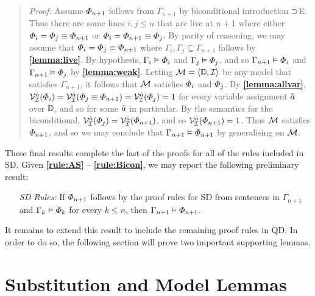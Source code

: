 
\begin{quote} 
  \textit{Proof:} Assume $\varPhi_{n+1}$ follows from $\Gamma_{n+1}$ by biconditional introduction $\supset$E.
Thus there are some lines $i,j\leq n$ that are live at $n+1$ where either $\varPhi_i=\varPhi_j\equiv\varPhi_{n+1}$ or $\varPhi_i=\varPhi_{n+1}\equiv\varPhi_j$.
  By parity of reasoning, we may assume that $\varPhi_i=\varPhi_j\equiv\varPhi_{n+1}$ where $\Gamma_i,\Gamma_j\subseteq\Gamma_{n+1}$ follows by \textbf{\ref{lemma:live}}.
  By hypothesis, $\Gamma_i\vDash \varPhi_i$ and $\Gamma_j\vDash \varPhi_j$, and so $\Gamma_{n+1} \vDash \varPhi_i$ and $\Gamma_{n+1} \vDash \varPhi_j$ by \textbf{\ref{lemma:weak}}.
  Letting $\mathcal{M}=\langle\mathbb{D},\mathcal{I}\rangle$ be any model that satisfies $\Gamma_{n+1}$, it follows that $\mathcal{M}$ satisfies $\varPhi_i$ and $\varPhi_j$.
  By \textbf{\ref{lemma:allvar}}, $\mathcal{V}_{\mathcal{I}}^{\hat{a}}(\varPhi_i)=\mathcal{V}_{\mathcal{I}}^{\hat{a}}(\varPhi_j\equiv\varPhi_{n+1})=\mathcal{V}_{\mathcal{I}}^{\hat{a}}(\varPhi_j)=1$ for every variable assignment $\hat{a}$ over $\mathbb{D}$, and so for some $\hat{a}$ in particular. 
  By the semantics for the biconditional, $\mathcal{V}_{\mathcal{I}}^{\hat{a}}(\varPhi_j)=\mathcal{V}_{\mathcal{I}}^{\hat{a}}(\varPhi_{n+1})$, and so $\mathcal{V}_{\mathcal{I}}^{\hat{a}}(\varPhi_{n+1})=1$.
  Thus $\mathcal{M}$ satisfies $\varPhi_{n+1}$, and so we may conclude that $\Gamma_{n+1} \vDash \varPhi_{n+1}$ by generalising on $\mathcal{M}$.
\end{quote}

These final results complete the last of the proofs for all of the rules included in SD.
Given \textbf{\ref{rule:AS}} -- \textbf{\ref{rule:Bicon}}, we may report the following preliminary result:

\begin{enumerate}[leftmargin=1.5in]
  \item[\it SD Rules:] If $\varPhi_{n+1}$ follows by the proof rules for SD from sentences in $\Gamma_{n+1}$ and $\Gamma_k \vDash \varPhi_k$ for every $k\leq n$, then $\Gamma_{n+1} \vDash \varPhi_{n+1}$.
\end{enumerate}

It remains to extend this result to include the remaining proof rules in QD.
In order to do so, the following section will prove two important supporting lemmas.



\section{Substitution and Model Lemmas}%
  \label{sec:Lemmas}

